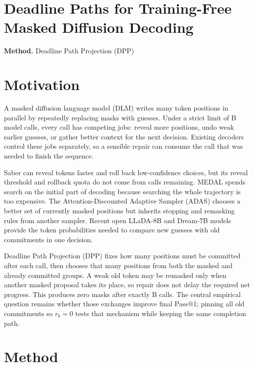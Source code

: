 \documentclass[10pt,a4paper]{article}
\begin{document}
\section*{Deadline Paths for Training-Free Masked Diffusion Decoding}
\textbf{Method.} Deadline Path Projection (DPP)
\section*{Motivation}
A masked diffusion language model (DLM) writes many token positions in parallel by repeatedly replacing masks with guesses. Under a strict limit of B model calls, every call has competing jobs: reveal more positions, undo weak earlier guesses, or gather better context for the next decision. Existing decoders control these jobs separately, so a sensible repair can consume the call that was needed to finish the sequence.

Saber can reveal tokens faster and roll back low-confidence choices, but its reveal threshold and rollback quota do not come from calls remaining. MEDAL spends search on the initial part of decoding because searching the whole trajectory is too expensive. The Attention-Discounted Adaptive Sampler (ADAS) chooses a better set of currently masked positions but inherits stopping and remasking rules from another sampler. Recent open LLaDA-8B and Dream-7B models provide the token probabilities needed to compare new guesses with old commitments in one decision.

Deadline Path Projection (DPP) fixes how many positions must be committed after each call, then chooses that many positions from both the masked and already committed groups. A weak old token may be remasked only when another masked proposal takes its place, so repair does not delay the required net progress. This produces zero masks after exactly B calls. The central empirical question remains whether those exchanges improve final Pass@1;\allowbreak{} pinning all old commitments so \(r_{b}=0\) tests that mechanism while keeping the same completion path.
\section*{Method}
\end{document}
